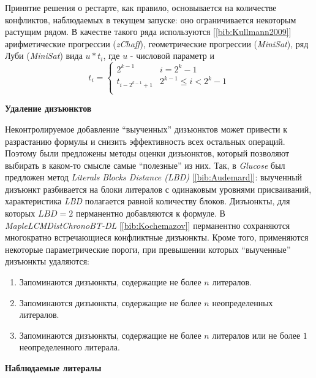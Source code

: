 Принятие решения о рестарте, как правило, основывается на количестве конфликтов, наблюдаемых в текущем запуске: 
оно ограничивается некоторым растущим рядом. В качестве такого ряда используются [\ref{bib:Kullmann2009}] арифметические прогрессии (\textit{zChaff}), геометрические прогрессии (\textit{MiniSat}), ряд Луби (\textit{MiniSat}) вида $u * t_i$, где $u$ - числовой параметр и 
\begin{equation*}
t_i = 
\begin{cases}
2^{k-1} & i = 2^k - 1 \\
t_{i - 2^{k-1} + 1} & 2^{k-1} \leq i < 2^k - 1 \\
\end{cases}
\end{equation*}

\textbf{Удаление дизъюнктов}

Неконтролируемое добавление \enquote{выученных} дизъюнктов может привести к разрастанию формулы и снизить эффективность всех остальных операций. Поэтому были предложены методы оценки дизъюнктов, который позволяют выбирать в каком-то смысле самые \enquote{полезные} из них. 
Так, в \textit{Glucose} был предложен метод \textit{Literals Blocks Distance (LBD)} [\ref{bib:Audemard}]: 
выученный дизъюнкт разбивается на блоки литералов с одинаковым уровнями присваиваний, 
характеристика \textit{LBD} полагается равной количеству блоков. Дизъюнкты, для которых $LBD=2$ перманентно добавляются к формуле. 
В \textit{MapleLCMDistChronoBT-DL} [\ref{bib:Kochemazov}] перманентно сохраняются многократно встречающиеся конфликтные дизъюнкты.  
Кроме того, применяются некоторые параметрические пороги, при превышении которых \enquote{выученные} дизъюнкты удаляются:

\begin{enumerate}[leftmargin=1cm,topsep=0pt,itemsep=-1ex,partopsep=1ex,parsep=1ex,label=\arabic{*}.]

\item Запоминаются дизъюнкты, содержащие не более $n$ литералов.

\item Запоминаются дизъюнкты, содержащие не более $n$ неопределенных литералов.

\item Запоминаются дизъюнкты, содержащие не более $n$ литералов или не более $1$ неопределенного литерала.

\end{enumerate}

\textbf{Наблюдаемые литералы}

